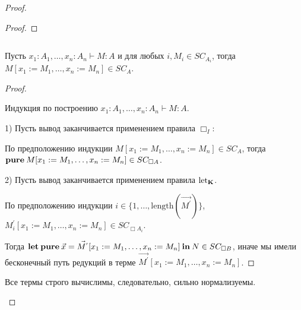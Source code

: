\begin{proof}
\begin{proof}
\end{proof}

\begin{lemma}
$ $

Пусть $x_1 : A_1,\dots, x_n : A_n \vdash M : A$ и для любых $i, M_i \in SC_{A_i}$, тогда $M [x_1 := M_1,\dots,x_n := M_n] \in SC_A$.
\end{lemma}

\begin{proof}
$ $

Индукция по построению $x_1 : A_1,\dots, x_n : A_n \vdash M : A$.

1) Пусть вывод заканчивается применением правила ${\Box}_I$:

\begin{prooftree}
\end{prooftree}

По предположению индукции $M [x_1 := M_1,\dots,x_n := M_n] \in SC_A$, тогда ${\bf pure \:} M [x_1 := M_1,\dots,x_n := M_n] \in SC_{\Box A}$.

\vspace{\baselineskip}

2) Пусть вывод заканчивается применением правила $\text{let}_{\bf K}$.
\begin{prooftree}
\end{prooftree}

По предположению индукции $i \in \{ 1,\dots,\text{length}(\vec{M^{'}}) \}$, $M_i^{'} [x_1 := M_1,\dots,x_n := M_n] \in SC_{\Box A_i}$.

Тогда ${\bf let \: pure \:} \vec{x} = \vec{M^{'}} [x_1 := M_1,\dots,x_n := M_n] {\: \bf in \:} N \in SC_{\Box B}$,
иначе мы имели бесконечный путь редукций в терме $\vec{M^{'}} [x_1 := M_1,\dots,x_n := M_n]$.
\end{proof}

\begin{col}

Все термы строго вычислимы, следовательно, сильно нормализуемы.
\end{col}

\end{proof}


